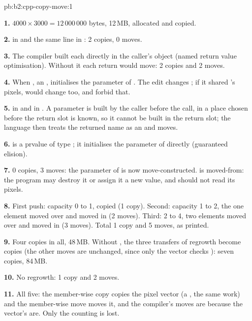 \begin{solution}{pb:b2:cpp-copy-move:1}

\textbf{1.} $4000 \times 3000 = 12\,000\,000$ bytes, 12\,MB, allocated and copied.

\textbf{2.}  in  and the same line in : 2 copies, 0 moves.

\textbf{3.} The compiler built each  directly in the caller's object (named return value optimisation).
Without it each return would move: 2 copies and 2 moves.

\textbf{4.} When , an , initialises the parameter  of . The edit changes
; if it shared 's pixels,  would change too, and  forbid that.

\textbf{5.}  in  and in . A parameter is built by the caller before the
call, in a place chosen before the return slot is known, so it cannot be built in the return slot; the language then
treats the returned name as an  and moves.

\textbf{6.}  is a prvalue of type ; it initialises the parameter of 
directly (guaranteed elision).

\textbf{7.} 0 copies, 3 moves: the parameter of  is now move-constructed.  is
moved-from: the program may destroy it or assign it a new value, and should not read its pixels.

\textbf{8.} First push: capacity 0 to 1,  copied (1 copy). Second: capacity 1 to 2, the one element moved
over and  moved in (2 moves). Third: 2 to 4, two elements moved over and  moved in (3 moves). Total
1 copy and 5 moves, as printed.

\textbf{9.} Four copies in all, 48\,MB. Without , the three transfers of regrowth become copies (the
other moves are unchanged, since only the vector checks ): seven copies, 84\,MB.

\textbf{10.} No regrowth: 1 copy and 2 moves.

\textbf{11.} All five: the member-wise copy copies the pixel vector (a , the same work) and the member-wise
move moves it, and the compiler's moves are  because the vector's are. Only the counting is lost.


\end{solution}
